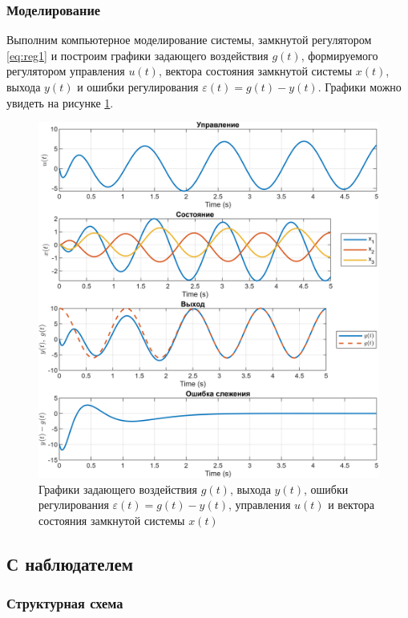 \subsubsection{Моделирование}

Выполним компьютерное моделирование системы, замкнутой регулятором
\eqref{eq:reg1} и построим графики задающего воздействия $g(t)$, формируемого 
регулятором управления $u(t)$, вектора состояния замкнутой системы $x(t)$, выхода
$y(t)$ и ошибки регулирования $\varepsilon(t) = g(t) - y(t)$. Графики можно
увидеть на рисунке \ref{fig:1_0_sim}.

\begin{figure}[H]
    \centering
    \includegraphics[width=\linewidth]{figs/1_0_sim.png}
    \caption{Графики задающего воздействия $g(t)$, выхода
    $y(t)$, ошибки регулирования $\varepsilon(t) = g(t) - y(t)$,
    управления $u(t)$ и вектора состояния замкнутой системы $x(t)$}
    \label{fig:1_0_sim}
\end{figure}



\subsection{С наблюдателем}

\subsubsection{Структурная схема}

